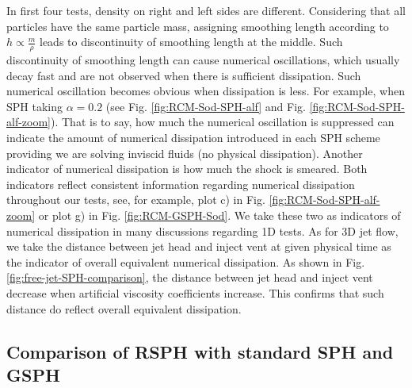 \documentclass[preprint,12pt,authoryear]{elsarticle}
\begin{document}
In first four tests, density on right and left sides are different. Considering that all particles have the same particle mass, assigning smoothing length according to $h \propto \frac{m}{\rho}$ leads to discontinuity of smoothing length at the middle. Such discontinuity of smoothing length can cause numerical oscillations, which usually decay fast and are not observed when there is sufficient dissipation. 
Such numerical oscillation becomes obvious when dissipation is less. For example, when SPH taking $\alpha=0.2$ (see Fig. \ref{fig:RCM-Sod-SPH-alf} and Fig. \ref{fig:RCM-Sod-SPH-alf-zoom}). That is to say, how much the numerical oscillation is suppressed can indicate the amount of numerical dissipation introduced in each SPH scheme providing we are solving inviscid fluids (no physical dissipation).
Another indicator of numerical dissipation is how much the shock is smeared. Both indicators reflect consistent information regarding numerical dissipation throughout our tests, see, for example, plot c) in Fig. \ref{fig:RCM-Sod-SPH-alf-zoom} or plot g) in Fig. \ref{fig:RCM-GSPH-Sod}. 
We take these two as indicators of numerical dissipation in many discussions regarding 1D tests.
As for 3D jet flow, we take the distance between jet head and inject vent at given physical time as the indicator of overall equivalent numerical dissipation. As shown in Fig. \ref{fig:free-jet-SPH-comparison}, the distance between jet head and inject vent decrease when artificial viscosity coefficients increase. This confirms that such distance do reflect overall equivalent dissipation.

\subsection{Comparison of RSPH with standard SPH and GSPH}
\end{document}
